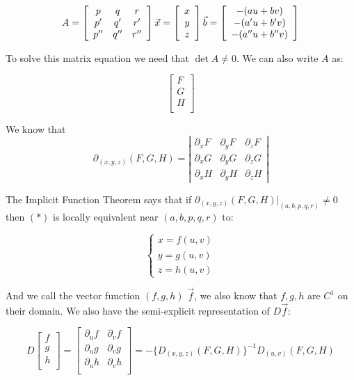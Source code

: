 \documentclass[11 pt, twoside]{article}
\begin{document}
\[
A = 
\left[\begin{array}{ccc}
p & q & r\\
p' & q' & r'\\
p'' & q'' & r''
\end{array}\right]
\hfill
\vec{x} =
\left[\begin{array}{c}
x\\
y\\
z\\
\end{array}\right]
\hfill
\vec{b} = 
\left[\begin{array}{c}
-(au + bv) \\
-(a'u + b'v) \\
-(a''u + b''v) \\
\end{array}\right]
\]

To solve this matrix equation we need that $\det A \neq 0$. We can also write
$A$ as:

\[
\left[\begin{array}{c}
F \\
G \\
H \\
\end{array}\right]
\]

We know that
$$\partial_{(x, y, z)} (F, G, H) = \left|
\begin{array}{ccc}
\partial_x F & \partial_y F & \partial_z F \\
\partial_x G & \partial_y G & \partial_z G \\
\partial_x H & \partial_y H & \partial_z H
\end{array}
\right|$$

The Implicit Function Theorem says that if $\partial_{(x, y, z)} (F, G, H)
|_{(a, b, p, q, r)} \neq 0$ then $(*)$ is locally equivalent near $(a, b, p, q,
r)$ to:

\[
\begin{cases}
x = f(u, v) \\
y = g(u, v) \\
z = h(u, v)
\end{cases}
\]

And we call the vector function $(f, g, h)$ $\vec{f}$, we also know that $f, g,
h$ are $C^1$ on their domain. We also have the semi-explicit representation of
$D\vec{f}$:

\[
D\left[\begin{array}{c}
f \\
g \\
h \\
\end{array}\right] = 
\left[\begin{array}{cc}
\partial_u f & \partial_v f \\
\partial_u g & \partial_v g \\
\partial_u h & \partial_v h \\
\end{array}\right] =
-\{D_{(x, y, z)}(F, G, H)\}^{-1} D_{(u, v)} (F, G, H)
\]
\end{document}
